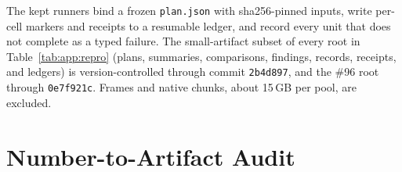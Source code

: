 The kept runners bind a frozen \texttt{plan.json} with sha256-pinned inputs, write per-cell markers and receipts to a resumable ledger, and record every unit that does not complete as a typed failure. The small-artifact subset of every root in Table~\ref{tab:app:repro} (plans, summaries, comparisons, findings, records, receipts, and ledgers) is version-controlled through commit \texttt{2b4d897}, and the \#96 root through \texttt{0e7f921c}. Frames and native chunks, about 15\,GB per pool, are excluded. %

\section{Number-to-Artifact Audit}
\label{sec:app:audit}

